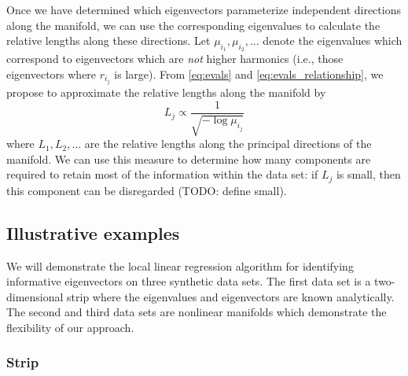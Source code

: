 \documentclass[preprint]{elsarticle}
\begin{document}
Once we have determined which eigenvectors parameterize independent directions along the manifold, we can use the corresponding eigenvalues to calculate the relative lengths along these directions. 
%
Let $\mu_{i_1}, \mu_{i_2}, \dots$ denote the eigenvalues which correspond to eigenvectors which are {\em not} higher harmonics (i.e., those eigenvectors where $r_{i_j}$ is large). 
%
From \eqref{eq:evals} and \eqref{eq:evals_relationship}, we propose to approximate the relative lengths along the manifold by
\begin{equation} \label{eq:est_lengths}
L_j \propto \frac{1}{\sqrt{-\log \mu_{i_j}}}
\end{equation}
where $L_1, L_2, \dots$ are the relative lengths along the principal directions of the manifold. 
%
We can use this measure to determine how many components are required to retain most of the information within the data set: if $L_j$ is small, then this component can be disregarded (TODO: define small). 


\subsection{Illustrative examples} \label{sec:illustrative_examples}

We will demonstrate the local linear regression algorithm for identifying informative eigenvectors on three synthetic data sets. 
%
The first data set is a two-dimensional strip where the eigenvalues and eigenvectors are known analytically.
%
The second and third data sets are nonlinear manifolds which demonstrate the flexibility of our approach. 

\subsubsection{Strip}
\end{document}
